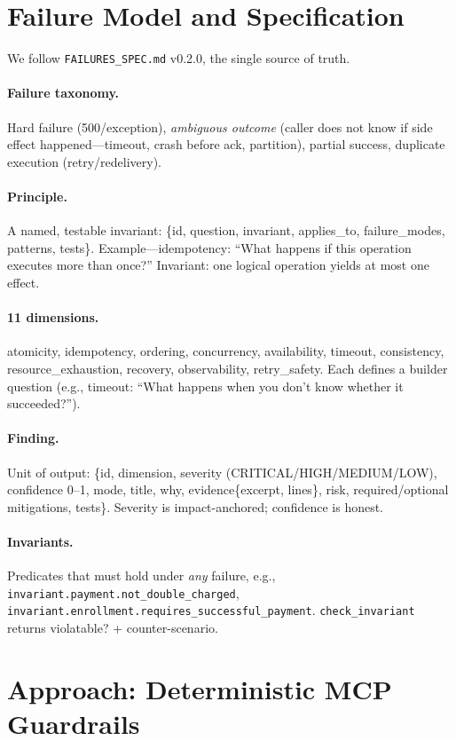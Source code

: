 \documentclass[conference]{IEEEtran}
\begin{document}
\section{Failure Model and Specification}
We follow \texttt{FAILURES\_SPEC.md} v0.2.0, the single source of truth.

\paragraph{Failure taxonomy.} Hard failure (500/exception), \emph{ambiguous outcome} (caller does not know if side effect happened---timeout, crash before ack, partition), partial success, duplicate execution (retry/redelivery).

\paragraph{Principle.} A named, testable invariant: \{id, question, invariant, applies\_to, failure\_modes, patterns, tests\}. Example---idempotency: ``What happens if this operation executes more than once?'' Invariant: one logical operation yields at most one effect.

\paragraph{11 dimensions.} atomicity, idempotency, ordering, concurrency, availability, timeout, consistency, resource\_exhaustion, recovery, observability, retry\_safety. Each defines a builder question (e.g., timeout: ``What happens when you don't know whether it succeeded?'').

\paragraph{Finding.} Unit of output: \{id, dimension, severity (CRITICAL/HIGH/MEDIUM/LOW), confidence 0--1, mode, title, why, evidence\{excerpt, lines\}, risk, required/optional mitigations, tests\}. Severity is impact-anchored; confidence is honest.

\paragraph{Invariants.} Predicates that must hold under \emph{any} failure, e.g., \texttt{invariant.payment.not\_double\_charged}, \texttt{invariant.enrollment.requires\_successful\_payment}. \texttt{check\_invariant} returns violatable? + counter-scenario.
\section{Approach: Deterministic MCP Guardrails}
\end{document}
